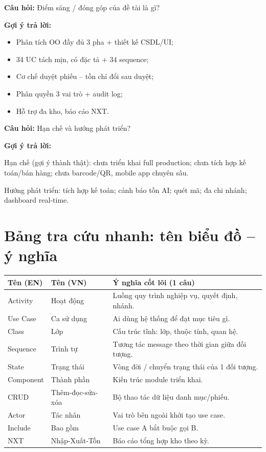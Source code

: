 \documentclass[12pt,a4paper]{article}
\newcommand{\cau}[1]{\textbf{\textcolor{qblue}{Câu hỏi:}} #1}
\newcommand{\traloi}{\par\smallskip\textbf{\textcolor{qblue!70!black}{Gợi ý trả lời:}}\par}
\begin{document}
\begin{cauhoi}[Câu 37]
\cau{Điểm sáng / đóng góp của đề tài là gì?}
\traloi
\begin{itemize}[leftmargin=1.4em,itemsep=2pt]
  \item Phân tích OO đầy đủ 3 pha + thiết kế CSDL/UI;
  \item 34 UC tách mịn, có đặc tả + 34 sequence;
  \item Cơ chế duyệt phiếu -- tồn chỉ đổi sau duyệt;
  \item Phân quyền 3 vai trò + audit log;
  \item Hỗ trợ đa kho, báo cáo NXT.
\end{itemize}
\end{cauhoi}

\begin{cauhoi}[Câu 38]
\cau{Hạn chế và hướng phát triển?}
\traloi
Hạn chế (gợi ý thành thật): chưa triển khai full production; chưa tích hợp kế toán/bán hàng; chưa barcode/QR, mobile app chuyên sâu.

Hướng phát triển: tích hợp kế toán; cảnh báo tồn AI; quét mã; đa chi nhánh; dashboard real-time.
\end{cauhoi}

\section{Bảng tra cứu nhanh: tên biểu đồ -- ý nghĩa}

\begin{center}
\renewcommand{\arraystretch}{1.3}
\begin{tabular}{|p{3.0cm}|p{3.2cm}|p{7.2cm}|}
\hline
\textbf{Tên (EN)} & \textbf{Tên (VN)} & \textbf{Ý nghĩa cốt lõi (1 câu)} \\
\hline
Activity & Hoạt động & Luồng quy trình nghiệp vụ, quyết định, nhánh. \\
\hline
Use Case & Ca sử dụng & Ai dùng hệ thống để đạt mục tiêu gì. \\
\hline
Class & Lớp & Cấu trúc tĩnh: lớp, thuộc tính, quan hệ. \\
\hline
Sequence & Trình tự & Tương tác message theo thời gian giữa đối tượng. \\
\hline
State & Trạng thái & Vòng đời / chuyển trạng thái của 1 đối tượng. \\
\hline
Component & Thành phần & Kiến trúc module triển khai. \\
\hline
CRUD & Thêm-đọc-sửa-xóa & Bộ thao tác dữ liệu danh mục/phiếu. \\
\hline
Actor & Tác nhân & Vai trò bên ngoài khởi tạo use case. \\
\hline
Include & Bao gồm & Use case A bắt buộc gọi B. \\
\hline
NXT & Nhập-Xuất-Tồn & Báo cáo tổng hợp kho theo kỳ. \\
\hline
\end{tabular}
\end{center}
\end{document}
